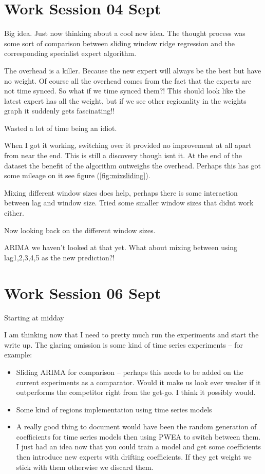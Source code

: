 \documentclass[envcountsame]{llncs}
\begin{document}
\section{Work Session 04 Sept}

Big idea. Just now thinking about a cool new idea. The thought process was some sort of comparison between sliding window ridge regression and the corresponding specialist expert algorithm.

The overhead is a killer. Because the new expert will always be the best but have no weight. Of course all the overhead comes from the fact that the experts are not time synced. So what if we time synced them?! This should look like the latest expert has all the weight, but if we see other regionality in the weights graph it suddenly gets fascinating!!

Wasted a lot of time being an idiot.

When I got it working, switching over it provided no improvement at all apart from near the end. This is still a discovery though isnt it. At the end of the dataset the benefit of the algorithm outweighs the overhead. Perhaps this has got some mileage on it see figure (\ref{fig:mixsliding}). 

Mixing different window sizes does help, perhaps there is some interaction between lag and window size. Tried some smaller window sizes that didnt work either.
	
Now looking back on the different window sizes. 

ARIMA we haven't looked at that yet.
What about mixing between using lag1,2,3,4,5 as the new prediction?!


\section{Work Session 06 Sept}

Starting at midday

I am thinking now that I need to pretty much run the experiments and start the write up. The glaring omission is some kind of time series experiments -- for example: 

\begin{itemize}
\item Sliding ARIMA for comparison -- perhaps this needs to be added on the current experiments as a comparator. Would it make us look ever weaker if it outperforms the competitor right from the get-go. I think it possibly would. 
\item Some kind of regions implementation using time series models
\item A really good thing to document would have been the random generation of coefficients for time series models then using PWEA to switch between them. I just had an idea now that you could train a model and get some coefficients then introduce new experts with drifting coefficients. If they get weight we stick with them otherwise we discard them. 
\end{itemize}
\end{document}
